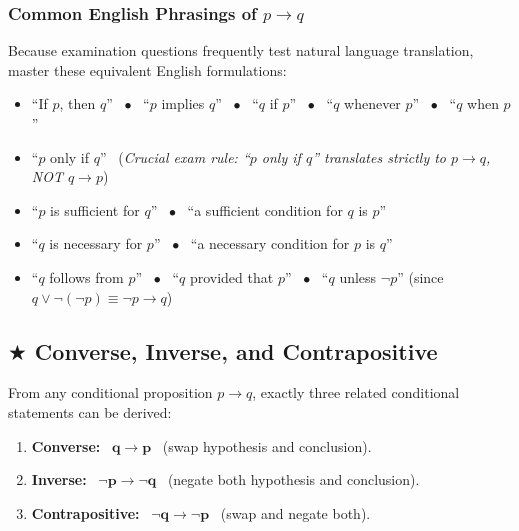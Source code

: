 \documentclass[11pt,a4paper]{article}
\begin{document}
\subsubsection{Common English Phrasings of $p \rightarrow q$}
Because examination questions frequently test natural language translation, master these equivalent English formulations:
\begin{itemize}
    \item ``If $p$, then $q$'' \ $\bullet$ \ ``$p$ implies $q$'' \ $\bullet$ \ ``$q$ if $p$'' \ $\bullet$ \ ``$q$ whenever $p$'' \ $\bullet$ \ ``$q$ when $p$''
    \item ``$p$ only if $q$'' \ (\textit{Crucial exam rule: ``$p$ only if $q$'' translates strictly to $p \rightarrow q$, NOT $q \rightarrow p$})
    \item ``$p$ is sufficient for $q$'' \ $\bullet$ \ ``a sufficient condition for $q$ is $p$''
    \item ``$q$ is necessary for $p$'' \ $\bullet$ \ ``a necessary condition for $p$ is $q$''
    \item ``$q$ follows from $p$'' \ $\bullet$ \ ``$q$ provided that $p$'' \ $\bullet$ \ ``$q$ unless $\neg p$'' (since $q \vee \neg(\neg p) \equiv \neg p \rightarrow q$)
\end{itemize}

\subsection{\texorpdfstring{$\bigstar$ }{*}Converse, Inverse, and Contrapositive}
From any conditional proposition $p \rightarrow q$, exactly three related conditional statements can be derived:

\begin{defbox}
\begin{enumerate}
    \item \textbf{Converse:} \ $\mathbf{q \rightarrow p}$ \ (swap hypothesis and conclusion).
    \item \textbf{Inverse:} \ $\mathbf{\neg p \rightarrow \neg q}$ \ (negate both hypothesis and conclusion).
    \item \textbf{Contrapositive:} \ $\mathbf{\neg q \rightarrow \neg p}$ \ (swap and negate both).
\end{enumerate}
\end{defbox}
\end{document}
